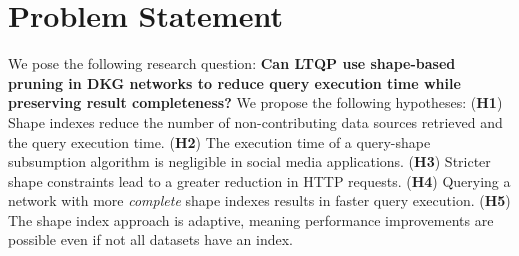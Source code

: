 \section{Problem Statement}\label{sec:problem_statement}

We pose the following research question: 
\textbf{Can LTQP use shape-based pruning in DKG networks to reduce query execution time while preserving result completeness?}
We propose the following hypotheses:  
(\textbf{H1}) Shape indexes reduce the number of non-contributing data sources retrieved and the query execution time.  
(\textbf{H2}) The execution time of a query-shape subsumption algorithm is negligible in social media applications.  
(\textbf{H3}) Stricter shape constraints lead to a greater reduction in HTTP requests.  
(\textbf{H4}) Querying a network with more \emph{complete} shape indexes results in faster query execution.  
(\textbf{H5}) The shape index approach is adaptive, meaning performance improvements are possible even if not all datasets have an index.


\iffalse
\newcounter{hypothesisCounter}
\setcounter{hypothesisCounter}{1}

\begin{itemize}[label=\textbf{H\arabic{hypothesisCounter}}\,\stepcounter{hypothesisCounter}]
    \item Using shape indexes will reduce the number of non-contributing data sources acquired
    \item Query-shape subsumption execution time is negligible in the context of social media applications
    \item Shapes with stricter constraints result in a greater reduction in HTTP requests.
    \item A network with a more \emph{complete} shape index will reduce more the number of HTTP requests and the query execution time than one with less
    \item The shape index approach can be adaptative, so not every dataset in the network needs to have an index to see a performance improvement
\end{itemize}
\fi